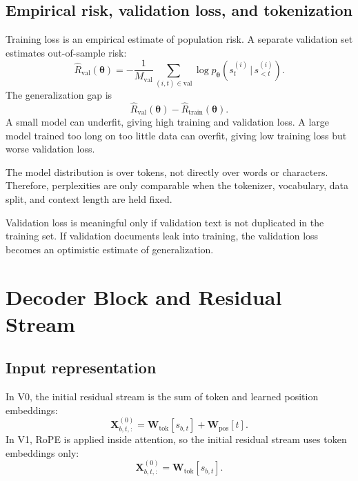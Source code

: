 \documentclass[11pt,a4paper]{article}
\theoremstyle{definition}
\theoremstyle{plain}
\newcommand{\vtheta}{\bm{\theta}}
\newcommand{\mW}{\bm{W}}
\newcommand{\mX}{\bm{X}}
\newcommand{\given}{\,|\,}
\begin{document}
\subsection{Empirical risk, validation loss, and tokenization}

Training loss is an empirical estimate of population risk. A separate validation set estimates out-of-sample risk:
\begin{equation}
    \widehat R_{\mathrm{val}}(\vtheta)=
    -\frac{1}{M_{\mathrm{val}}}\sum_{(i,t)\in\mathrm{val}}
    \log p_{\vtheta}(s^{(i)}_t\given s^{(i)}_{<t}).
\end{equation}
The generalization gap is
\begin{equation}
    \widehat R_{\mathrm{val}}(\vtheta)-\widehat R_{\mathrm{train}}(\vtheta).
\end{equation}
A small model can underfit, giving high training and validation loss. A large model trained too long on too little data can overfit, giving low training loss but worse validation loss.

The model distribution is over tokens, not directly over words or characters. Therefore, perplexities are only comparable when the tokenizer, vocabulary, data split, and context length are held fixed.

\begin{warningbox}
Validation loss is meaningful only if validation text is not duplicated in the training set. If validation documents leak into training, the validation loss becomes an optimistic estimate of generalization.
\end{warningbox}

\section{Decoder Block and Residual Stream}
\label{sec:block-residual}

\subsection{Input representation}

In V0, the initial residual stream is the sum of token and learned position embeddings:
\begin{equation}\label{eq:v0_embedding}
    \mX^{(0)}_{b,t,:}=\mW_{\mathrm{tok}}[s_{b,t}]+\mW_{\mathrm{pos}}[t].
\end{equation}
In V1, RoPE is applied inside attention, so the initial residual stream uses token embeddings only:
\begin{equation}\label{eq:v1_embedding}
    \mX^{(0)}_{b,t,:}=\mW_{\mathrm{tok}}[s_{b,t}].
\end{equation}
\end{document}
